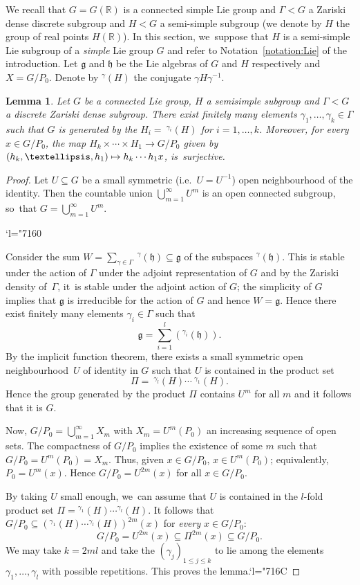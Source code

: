 \documentclass[10pt,a4paper]{amsart}
\newcommand{\ie}{i.e.\ }
\newcommand{\Changel}{\mathcode`l="7160}
\newcommand{\Changelback}{\mathcode`l="716C}
\def\mto{\mathchoice{\longmapsto}{\mapsto}{\mapsto}{\mapsto}}
\newtheorem{lemma}{Lemma}
\theoremstyle{definition}
\newcommand{\field}[1]{\mathbb{#1}}
\newcommand{\R}{\field{R}}
\let\g\gamma
\let\G\Gamma
\newcommand{\frg}{\mathfrak g}
\newcommand{\fh}{\mathfrak h}
\begin{document}
We recall that $G=G(\R)$ is a connected simple Lie group and $\G< G$ a Zariski dense discrete subgroup and $H<G$ a semi-simple subgroup (we denote by $H$ the group of real points $H(\R)$). In this section, we~suppose that $H$ is a semi-simple Lie subgroup of a \emph{simple} Lie group $G$ and refer to Notation~\ref{notation:Lie} of the introduction.
Let $\frg$ and $\fh$ be the Lie algebras of $G$ and $H$ respectively and $X=G/P_0$. Denote by $^{\g}(H)$ the conjugate $\g H \g ^{-1}$.

\begin{lemma} \label{G/Pgenerators} Let $G$ be a connected Lie group, $H$ a semisimple subgroup and $\Gamma<G$ a discrete Zariski dense subgroup. There exist finitely many elements $\g_1,\dots, \g_k \in \G$ such that $G$ is generated by the $H_i=\!{\ }^{\g_i}(H)$ for $i=1,\dots,k$. Moreover, for \emph{every} $x\in G/P_0$, the map $H_k\times \cdots \times H_1 \to G/P_0$ given by $(h_k,\dots,h_1)\mto h_k\cdots h_1x$, is~surjective.
\end{lemma}

\begin{proof} Let $U\subseteq G$ be a small symmetric (\ie $U=U^{-1}$) open neighbourhood of the identity. Then the countable union $\bigcup_{m=1}^{\infty} U^m$ is an open connected subgroup, so~that $G=\bigcup_{m=1}^{\infty} U^m$.

\Changel

Consider the sum $W=\sum_{\g \in \G} {\ }^{\g }(\fh) \subseteq \frg$ of the subspaces $^{\g}(\fh)$. This is stable under the action of $\G$ under the adjoint representation of $G$ and by the Zariski density of~$\G$, it~is stable under the adjoint action of $G$; the simplicity of $G$ implies that $\frg$ is irreducible for the action of $G$ and hence $W=\frg$. Hence there exist finitely many elements $\g_i \in \G$ such that
\[
\frg=\sum_{i=1}^l (^{\g_i}(\fh)).
\]
By the implicit function theorem, there exists a small symmetric open neighbourhood~$U$ of identity in $G$ such that $U$ is contained in the product set
\[
\Pi={\ }^{\g_l}(H)\cdots {\ }^{\g_1}(H).
\]
Hence the group generated by the product $\Pi$ contains $U^m$ for all $m$ and it follows that it is $G$.

Now, $G/P_0=\bigcup_{m=1}^{\infty} X_m$ with $X_m=U^m(P_0)$ an increasing sequence of open sets. The compactness of $G/P_0$ implies the existence of some $m$ such that $G/P_0=U^m(P_0)=X_m$. Thus, given $x\in G/P_0$, $x\in U^m(P_0)$; equivalently, $P_0=U^m(x)$. Hence $G/P_0=U^{2m}(x)$ for all $x\in G/P_0$.

By taking $U$ small enough, we~can assume that $U$ is contained in the $l$-fold product set $\Pi={}^{\g_1}(H)\cdots{} ^{\g_l}(H)$. It follows that $G/P_0 \subseteq (^{\g_1}(H)\cdots {}^{\g_l}(H))^{2m} (x)$ for \emph{every} $x\in G/P_0$:
\[
G/P_0=U^{2m}(x) \subseteq \Pi ^{2m}(x) \subseteq G/P_0.
\]
We may take $k=2ml$ and take the $(\g_j)_{1\leq j \leq k}$ to lie among the elements $\g_1,\dots, \g_l$ with possible repetitions. This proves the lemma.\Changelback
\end{proof}
\end{document}
